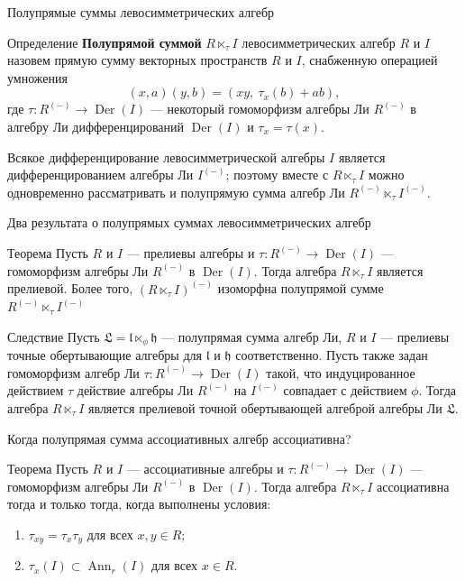 \documentclass[12pt,aspectratio=169]{beamer}
\DeclareMathOperator{\Ann}{Ann}
\DeclareMathOperator{\Der}{Der}
\newcommand{\term}[1]{{\color{MainRed}\bfseries #1}}
\begin{document}
\begin{frame}[t]{Полупрямые суммы левосимметрических алгебр}
    \small
    \begin{block}{Определение}
        \term{Полупрямой суммой} $R\ltimes_\tau I$ левосимметрических алгебр $R$ и
        $I$ назовем прямую сумму векторных пространств $R$ и $I$, снабженную
        операцией умножения
        \[
            (x,a)(y,b)=(xy,\ \tau_x(b)+ab),
        \]
        где $\tau\colon R^{(-)} \to \Der(I)$ --- некоторый гомоморфизм алгебры Ли
        $R^{(-)}$ в алгебру Ли дифференцирований $\Der(I)$ и $\tau_x = \tau(x)$.
    \end{block}

    Всякое дифференцирование левосимметрической алгебры $I$ является
    дифференцированием алгебры Ли $I^{(-)}$; поэтому вместе с $R\ltimes_\tau I$
    можно одновременно рассматривать и полупрямую сумма алгебр Ли
    $R^{(-)}\ltimes_\tau I^{(-)}$.
\end{frame}

\begin{frame}[t]{Два результата о полупрямых суммах левосимметрических алгебр}
    \small
    \begin{block}{Теорема}
        Пусть $R$ и $I$ --- прелиевы алгебры и $\tau\colon R^{(-)}\to\Der(I)$ ---
        гомоморфизм алгебры Ли $R^{(-)}$ в $\Der(I)$. Тогда алгебра $R\ltimes_{\tau} I$
        является прелиевой. Более того, $(R\ltimes_{\tau} I)^{(-)}$ изоморфна
        полупрямой сумме $R^{(-)}\ltimes_\tau I^{(-)}$
    \end{block}

    \begin{block}{Следствие}
        Пусть $\mathfrak{L} = \mathfrak{l}\ltimes_{\phi}\mathfrak{h}$ --- полупрямая
        сумма алгебр Ли, $R$ и $I$ --- прелиевы точные обертывающие алгебры для
        $\mathfrak{l}$ и $\mathfrak{h}$ соответственно. Пусть также задан гомоморфизм
        алгебр Ли $\tau\colon R^{(-)}\to\Der(I)$ такой, что индуцированное действием
        $\tau$ действие алгебры Ли $R^{(-)}$ на $I^{(-)}$ совпадает с действием $\phi$.
        Тогда алгебра $R\ltimes_{\tau} I$ является прелиевой точной обертывающей
        алгеброй алгебры Ли $\mathfrak{L}$.  \end{block}
\end{frame}

\begin{frame}[t]{Когда полупрямая сумма ассоциативных алгебр ассоциативна?}
    \small
    \begin{block}{Теорема}
        Пусть $R$ и $I$ --- ассоциативные алгебры и $\tau\colon R^{(-)}\to\Der(I)$
        --- гомоморфизм алгебры Ли $R^{(-)}$ в $\Der(I)$. Тогда алгебра
        $R\ltimes_{\tau} I$ ассоциативна тогда и только тогда, когда выполнены условия:
        \begin{enumerate}
            \item[\textup{(A)}] $\tau_{xy}=\tau_x\tau_y$ для всех $x,y\in R$;
            \item[\textup{(B)}] $\tau_x(I)\subset \Ann_r(I)$ для всех $x\in R$.
        \end{enumerate}
    \end{block}
\end{frame}
\end{document}
